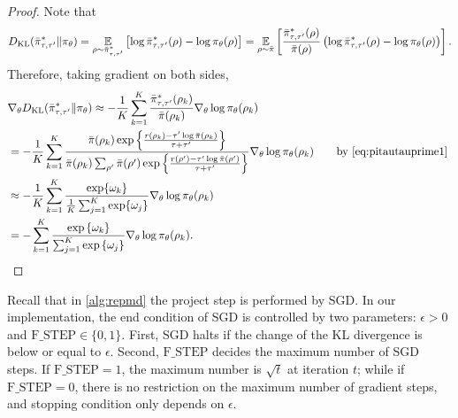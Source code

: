 \begin{proof}
	Note that
	\begin{equation*}
	\label{eq:importance_sampling_kl}
	D_{\mathrm{KL}}(\bar{\pi}_{\tau,\tau^{\prime}}^* \| \pi_\theta) = \operatorname*{\mathbb{E}}_{\rho \sim \bar{\pi}_{\tau,\tau^{\prime}}^* } \left[ \log \bar{\pi}_{\tau,\tau^{\prime}}^*(\rho) - \log \pi_\theta(\rho) \right] = \operatorname*{\mathbb{E}}_{\rho\sim \bar{\pi}} \left[  \frac{\bar{\pi}_{\tau,\tau^{\prime}}^*(\rho)}{\bar{\pi}(\rho)} \left(\log \bar{\pi}_{\tau,\tau^{\prime}}^*(\rho) - \log \pi_\theta(\rho) \right) \right].
	\end{equation*}	
	Therefore, taking gradient on both sides,
	\begin{equation}
	\begin{split}
	&\nabla_{\theta} \KL(\bar{\pi}_{\tau,\tau^{\prime}}^* \| \pi_\theta) \approx -\frac{1}{K}\sum_{k=1}^K \frac{\bar{\pi}_{\tau,\tau^{\prime}}^* (\rho_k)}{\refPi(\rho_k)} \nabla_{\theta} \log \pi_\theta(\rho_k)\\ 
	&= -\frac{1}{K}\sum_{k=1}^K \frac{ \refPi(\rho_k) \exp\left\{ \frac{r(\rho_k)-\tau^{\prime} \log \refPi(\rho_k) }{ \tau+\tau^{\prime}} \right\} }{\refPi(\rho_k)  \sum_{\rho^{\prime}}{\refPi(\rho^{\prime}) \exp\left\{ \frac{r(\rho^{\prime})-\tau^{\prime} \log \refPi(\rho^{\prime})}{ \tau+\tau^{\prime}} \right\} }  } \nabla_{\theta} \log \pi_\theta(\rho_k) \qquad \text{by \cref{eq:pitautauprime1} }  \\
	&\approx -\frac{1}{K}\sum_{k=1}^K \frac{\exp \{\omega_k\}} {\frac{1}{K} \sum_{j=1}^K \exp \{\omega_j\}} \nabla_{\theta} \log \pi_\theta(\rho_k) \\
	&=  -\sum\limits_{k=1}^K{ \frac{ \exp\left\{ \omega_k \right\} }{ \sum_{j=1}^K{ \exp\left\{ \omega_j \right\}}} \nabla_{\theta} \log{\pi_\theta(\rho_k)} } \qedhere.
	\end{split}
	\end{equation}
\end{proof}

Recall that in \cref{alg:repmd} the project step is performed by SGD. In our implementation, the end condition of SGD is controlled by two parameters: $\epsilon > 0$ and $\text{F\_STEP}\in \{0,1 \}$. First, SGD halts if the change of the KL divergence is below or equal to $\epsilon$. Second, $\text{F\_STEP}$ decides the maximum number of SGD steps. If $\text{F\_STEP}=1$, the maximum number is $\sqrt{t}$ at iteration $t$; while if $\text{F\_STEP}=0$, there is no restriction on the maximum number of gradient steps, and stopping condition only depends on $\epsilon$.

